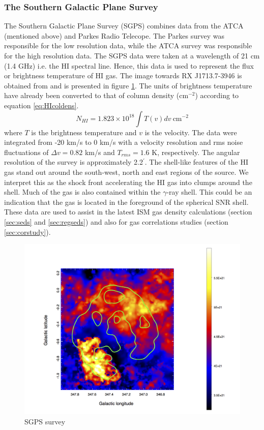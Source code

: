 \documentclass[12pt,a4paper]{article}
\begin{document}
\subsubsection{The Southern Galactic Plane Survey}
The Southern Galactic Plane Survey (SGPS) combines data from the ATCA (mentioned above) and Parkes Radio Telecope. The Parkes survey was responsible for the low resolution data, while the ATCA survey was responsible for the high resolution data. The SGPS data were taken at a wavelength of 21 cm (1.4 GHz) i.e. the HI spectral line. Hence, this data is used to represent the flux or brightness temperature of HI gas. The image towards RX J1713.7-3946 is obtained from \cite{2005ApJS..158..178M} and is presented in figure \ref{fig:SGPSmap}. The units of brightness temperature have already been converted to that of column density (cm$^{-2}$) according to equation \ref{eq:HIcoldens}.
\begin{equation}
\label{eq:HIcoldens}
N_{HI} = 1.823 \times 10^{18} \int T(v) dv \ \mathrm{ cm}^{-2}
\end{equation} 
where $T$ is the brightness temperature and $v$ is the velocity. The data were integrated from -20 km/s to 0 km/s with a velocity resolution and rms noise fluctuations of $\Delta v = 0.82$ km/s and $T_{rms} = 1.6$ K, respectively. The angular resolution of the survey is approximately 2.2$^\prime$. The shell-like features of the HI gas stand out around the south-west, north and east regions of the source. We interpret this as the shock front accelerating the HI gas into clumps around the shell. Much of the gas is also contained within the $\gamma$-ray shell. This could be an indication that the gas is located in the foreground of the spherical SNR shell. These data are used to assist in the latest ISM gas density calculations (section \ref{sec:seds} and \ref{sec:regseds}) and also for gas correlations studies (section \ref{sec:corstudy}).
\begin{figure}[H]
	\centering
	\includegraphics[width=0.75\linewidth, height=0.36\textheight]{SGPS_HI_map}
	\caption{SGPS survey }
	\label{fig:SGPSmap}
\end{figure}
\end{document}
